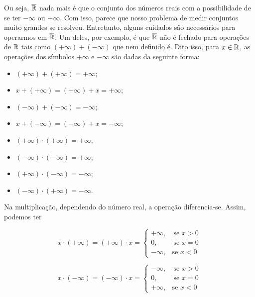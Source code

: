     Ou seja, $\operatorname{\overline{\mathbb{R}}}$ nada mais é que o conjunto dos números reais com a possibilidade de se ter $-\infty$ ou $+\infty$.
    Com isso, parece que nosso problema de medir conjuntos muito grandes se resolveu.
    Entretanto, alguns cuidados são necessários para operarmos em $\operatorname{\overline{\mathbb{R}}}$.
    Um deles, por exemplo, é que $\operatorname{\overline{\mathbb{R}}}$ não é fechado para operações de $\mathbb{R}$ tais como $(+\infty) + (-\infty)$ que nem definido é.
    Dito isso, para $x \in \mathbb{R}$, as operações dos símbolos $+\infty$ e $-\infty$ são dadas da seguinte forma:
    \begin{multicols}{2}
        \begin{itemize}
            \item $(+ \infty) + (+ \infty)  = + \infty$;
            \item $x + (+ \infty) = (+ \infty) + x = + \infty$;
            \item $(- \infty) + (- \infty)  = - \infty$;
            \item $x + (- \infty) = (- \infty) + x = - \infty$;
            \item $(+ \infty)\cdot (+ \infty) =  +\infty $;
            \item $(- \infty)\cdot (- \infty) =  +\infty $;
            \item $(+ \infty)\cdot (- \infty) =  -\infty $;
            \item $(- \infty)\cdot (+ \infty) =  -\infty $.
        \end{itemize}
    \end{multicols}
    Na multiplicação, dependendo do número real, a operação diferencia-se.
    Assim, podemos ter
    \begin{multicols}{2}
    $$
    x \cdot (+\infty) = (+\infty) \cdot x =
    \left\{\begin{array}{cc}
          +\infty, & \ \textrm{se } x > 0\\
          0, & \ \textrm{se } x = 0\\
          - \infty, & \textrm{se } x < 0
    \end{array}\right.
    $$
    
    $$
    x \cdot (-\infty) = (-\infty) \cdot x =
    \left\{\begin{array}{cc}
          -\infty, & \ \textrm{se } x > 0\\
          0, & \ \textrm{se } x = 0\\
          + \infty, & \textrm{se } x < 0
    \end{array}\right.
    $$  
    \end{multicols}


